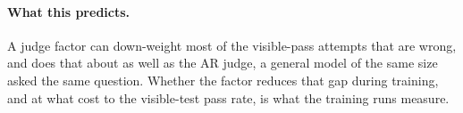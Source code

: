 \paragraph{What this predicts.} A judge factor can down-weight most of the visible-pass attempts that are wrong, and
\kev{} does that about as well as the AR judge, a general model of the same size asked the same question. Whether the factor
reduces that gap during training, and at what cost to the visible-test pass rate, is what the training runs measure.
